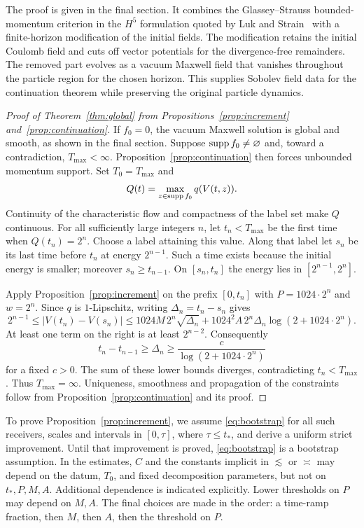 The proof is given in the final section. It combines the Glassey--Strauss
bounded-momentum criterion in the $H^5$ formulation quoted by Luk and
Strain~\cite[Theorem~1.1 and Footnote~1, arXiv version]{LukStrain2014Continuation}
with a finite-horizon modification of the initial fields. The modification retains the initial Coulomb field
and cuts off vector potentials for the divergence-free remainders.
The removed part evolves as a vacuum Maxwell field that vanishes
throughout the particle region for the chosen horizon. This supplies
Sobolev field data for the continuation theorem while preserving
the original particle dynamics.

\begin{proof}[Proof of Theorem~\ref{thm:global} from
Propositions~\ref{prop:increment} and~\ref{prop:continuation}]
If $f_0=0$, the vacuum Maxwell solution is global and smooth, as shown
in the final section. Suppose $\operatorname{supp} f_0\ne\varnothing$ and, toward a
contradiction, $T_{\max}<\infty$. Proposition~\ref{prop:continuation}
then forces unbounded momentum support. Set $T_0=T_{\max}$ and
\[
 Q(t)=\max_{z\in\operatorname{supp} f_0}q(V(t,z)).
\]
Continuity of the characteristic flow and compactness of the label
set make $Q$ continuous. For all sufficiently large integers $n$,
let $t_n<T_{\max}$ be the first time when $Q(t_n)=2^n$.
Choose a label attaining this value. Along that label let $s_n$
be its last time before $t_n$ at energy $2^{n-1}$. Such a time
exists because the initial energy is smaller; moreover
$s_n\ge t_{n-1}$. On $[s_n,t_n]$ the energy lies in
$[2^{n-1},2^n]$.

Apply Proposition~\ref{prop:increment} on the prefix $[0,t_n]$
with $P=1024\cdot2^n$ and $w=2^n$. Since $q$ is $1$-Lipschitz,
writing $\Delta_n=t_n-s_n$ gives
\[
 2^{n-1}\le |V(t_n)-V(s_n)|
 \le 1024M\,2^n\sqrt{\Delta_n}
   +1024^2A\,2^n\Delta_n\log(2+1024\cdot2^n).
\]
At least one term on the right is at least $2^{n-2}$.
Consequently
\[
 t_n-t_{n-1}\ge\Delta_n
 \ge \frac{c}{\log(2+1024\cdot2^n)}
\]
for a fixed $c>0$. The sum of these lower bounds diverges,
contradicting $t_n<T_{\max}$. Thus $T_{\max}=\infty$.
Uniqueness, smoothness and propagation of the constraints follow
from Proposition~\ref{prop:continuation} and its proof.
\end{proof}

To prove Proposition~\ref{prop:increment}, we assume \eqref{eq:bootstrap} for all such
receivers, scales and intervals in $[0,\tau]$, where $\tau\le t_*$,
and derive a uniform strict improvement. Until that improvement is
proved, \eqref{eq:bootstrap} is a bootstrap assumption.
In the estimates, $C$ and the constants implicit in $\lesssim$ or
$\asymp$ may depend on the datum, $T_0$, and fixed decomposition
parameters, but not on $t_*,P,M,A$. Additional dependence is indicated
explicitly. Lower thresholds on $P$ may depend on $M,A$.
The final choices are made in the order: a time-ramp fraction,
then $M$, then $A$, then the threshold on $P$.

